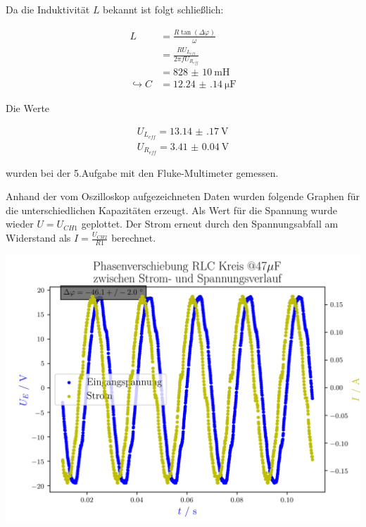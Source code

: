 \documentclass[11pt,ngerman]{scrartcl}
\begin{document}
\vspace{2mm}

Da die Induktivität $L$ bekannt ist folgt schließlich:

\begin{align*}
	L                 & = \frac{R \tan{(\Delta \varphi)}}{\omega}  \\
	                  & = \frac{R U_{L_{eff}}}{2\pi f U_{R_{eff}}} \\
	                  & = \SI{828(10)}{\milli\henry}               \\
	\hookrightarrow C & = \SI{12.24(14)}{\micro\farad}
\end{align*}

Die Werte

\begin{align*}
	U_{L_{eff}}= \SI{13.14(17)}{\volt} \\
	U_{R_{eff}} =\SI{3.41(4)}{\volt}
\end{align*}

wurden bei der 5.Aufgabe mit den Fluke-Multimeter gemessen.


\vspace{2mm}

Anhand der vom Oszilloskop aufgezeichneten Daten wurden folgende Graphen für die unterschiedlichen Kapazitäten erzeugt.
Als Wert für die Spannung wurde wieder $U = U_{CH1}$ geplottet. Der Strom erneut durch den Spannungsabfall am Widerstand als $I = \frac{U_{CH2}}{R1}$ berechnet.

\begin{center}
	\begin{minipage}[t]{0.8\textwidth}
		\includegraphics[width=\textwidth]{./figures/phaseleistung/Versuch6/phaseshiftrlc15.png}
		\label{fig:phaseshiftrlc15}
	\end{minipage}
\end{center}
\end{document}
